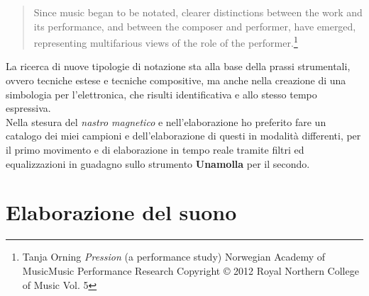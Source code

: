 \begin{quotation}
Since music began to be notated, clearer distinctions between the work and its performance, and between the composer and performer, have emerged, representing multifarious views of the role of the performer.\footnote{Tanja Orning \textit{Pression} (a performance study) Norwegian Academy of MusicMusic Performance Research Copyright © 2012 Royal Northern College of Music Vol. 5}
\end{quotation}

La ricerca di nuove tipologie di notazione sta alla base della prassi strumentali, ovvero tecniche estese e tecniche compositive, ma anche nella creazione di una simbologia per l'elettronica, che risulti identificativa e allo stesso tempo espressiva. \\
Nella stesura del \textit{nastro magnetico} e nell'elaborazione ho preferito fare un catalogo dei miei campioni e dell'elaborazione di questi in modalità differenti, per il primo movimento e di elaborazione in tempo reale tramite filtri ed equalizzazioni in guadagno sullo strumento \textbf{Unamolla} per il secondo.


\section{Elaborazione del suono}

